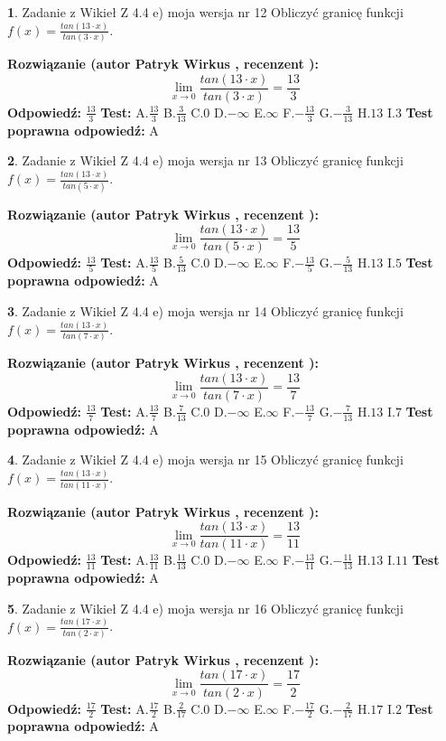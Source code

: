 \documentclass[12pt, a4paper]{article}
\theoremstyle{definition} %
\newtheorem{zad}{}
\newcommand{\zadStart}[1]{\begin{zad}#1\newline}
\newcommand{\zadStop}{\end{zad}}
\newcommand{\rozwStart}[2]{\noindent \textbf{Rozwiązanie (autor #1 , recenzent #2): }\newline}
\newcommand{\rozwStop}{\newline}
\newcommand{\odpStart}{\noindent \textbf{Odpowiedź:}\newline}
\newcommand{\odpStop}{\newline}
\newcommand{\testStart}{\noindent \textbf{Test:}\newline}
\newcommand{\testStop}{\newline}
\newcommand{\kluczStart}{\noindent \textbf{Test poprawna odpowiedź:}\newline}
\newcommand{\kluczStop}{\newline}
\begin{document}
\zadStart{Zadanie z Wikieł Z 4.4 e) moja wersja nr 12}
Obliczyć granicę funkcji $f(x)=\frac{tan(13\cdot x)}{tan(3\cdot x)}$.
\zadStop
\rozwStart{Patryk Wirkus}{}
$$\lim\limits_{x\to 0}\frac{tan(13\cdot x)}{tan(3\cdot x)}=
\frac{13}{3}$$
\rozwStop
\odpStart
$\frac{13}{3}$
\odpStop
\testStart
A.$\frac{13}{3}$
B.$\frac{3}{13}$
C.$0$
D.$-\infty$
E.$\infty$
F.$-\frac{13}{3}$
G.$-\frac{3}{13}$
H.$13$
I.$3$
\testStop
\kluczStart
A
\kluczStop



\zadStart{Zadanie z Wikieł Z 4.4 e) moja wersja nr 13}
Obliczyć granicę funkcji $f(x)=\frac{tan(13\cdot x)}{tan(5\cdot x)}$.
\zadStop
\rozwStart{Patryk Wirkus}{}
$$\lim\limits_{x\to 0}\frac{tan(13\cdot x)}{tan(5\cdot x)}=
\frac{13}{5}$$
\rozwStop
\odpStart
$\frac{13}{5}$
\odpStop
\testStart
A.$\frac{13}{5}$
B.$\frac{5}{13}$
C.$0$
D.$-\infty$
E.$\infty$
F.$-\frac{13}{5}$
G.$-\frac{5}{13}$
H.$13$
I.$5$
\testStop
\kluczStart
A
\kluczStop



\zadStart{Zadanie z Wikieł Z 4.4 e) moja wersja nr 14}
Obliczyć granicę funkcji $f(x)=\frac{tan(13\cdot x)}{tan(7\cdot x)}$.
\zadStop
\rozwStart{Patryk Wirkus}{}
$$\lim\limits_{x\to 0}\frac{tan(13\cdot x)}{tan(7\cdot x)}=
\frac{13}{7}$$
\rozwStop
\odpStart
$\frac{13}{7}$
\odpStop
\testStart
A.$\frac{13}{7}$
B.$\frac{7}{13}$
C.$0$
D.$-\infty$
E.$\infty$
F.$-\frac{13}{7}$
G.$-\frac{7}{13}$
H.$13$
I.$7$
\testStop
\kluczStart
A
\kluczStop



\zadStart{Zadanie z Wikieł Z 4.4 e) moja wersja nr 15}
Obliczyć granicę funkcji $f(x)=\frac{tan(13\cdot x)}{tan(11\cdot x)}$.
\zadStop
\rozwStart{Patryk Wirkus}{}
$$\lim\limits_{x\to 0}\frac{tan(13\cdot x)}{tan(11\cdot x)}=
\frac{13}{11}$$
\rozwStop
\odpStart
$\frac{13}{11}$
\odpStop
\testStart
A.$\frac{13}{11}$
B.$\frac{11}{13}$
C.$0$
D.$-\infty$
E.$\infty$
F.$-\frac{13}{11}$
G.$-\frac{11}{13}$
H.$13$
I.$11$
\testStop
\kluczStart
A
\kluczStop



\zadStart{Zadanie z Wikieł Z 4.4 e) moja wersja nr 16}
Obliczyć granicę funkcji $f(x)=\frac{tan(17\cdot x)}{tan(2\cdot x)}$.
\zadStop
\rozwStart{Patryk Wirkus}{}
$$\lim\limits_{x\to 0}\frac{tan(17\cdot x)}{tan(2\cdot x)}=
\frac{17}{2}$$
\rozwStop
\odpStart
$\frac{17}{2}$
\odpStop
\testStart
A.$\frac{17}{2}$
B.$\frac{2}{17}$
C.$0$
D.$-\infty$
E.$\infty$
F.$-\frac{17}{2}$
G.$-\frac{2}{17}$
H.$17$
I.$2$
\testStop
\kluczStart
A
\kluczStop
\end{document}
